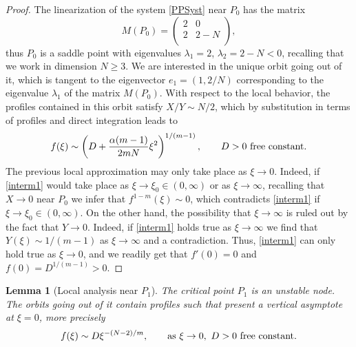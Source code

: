 \documentclass[a4paper,11pt]{article}
\newtheorem{lemma}[theorem]{Lemma}
\numberwithin{equation}{section}
\begin{document}
\begin{proof}
The linearization of the system \eqref{PPSyst} near $P_0$ has the matrix
$$M(P_0)=\left(
  \begin{array}{cc}
    2 & 0 \\
    2 & 2-N \\
  \end{array}
\right),$$
thus $P_0$ is a saddle point with eigenvalues $\lambda_1=2$, $\lambda_2=2-N<0$, recalling that we work in dimension $N\geq3$. We are interested in the unique orbit going out of it, which is tangent to the eigenvector $e_1=(1,2/N)$ corresponding to the eigenvalue $\lambda_1$ of the matrix $M(P_0)$. With respect to the local behavior, the profiles contained in this orbit satisfy $X/Y\sim N/2$, which by substitution in terms of profiles and direct integration leads to
\begin{equation}\label{interm1}
f(\xi)\sim\left(D+\frac{\alpha(m-1)}{2mN}\xi^2\right)^{1/(m-1)}, \qquad D>0 \ {\rm free \ constant}.
\end{equation}
The previous local approximation may only take place as $\xi\to0$. Indeed, if \eqref{interm1} would take place as $\xi\to\xi_0\in(0,\infty)$ or as $\xi\to\infty$, recalling that $X\to0$ near $P_0$ we infer that $f^{1-m}(\xi)\sim0$, which contradicts \eqref{interm1} if $\xi\to\xi_0\in(0,\infty)$. On the other hand, the possibility that $\xi\to\infty$ is ruled out by the fact that $Y\to0$. Indeed, if \eqref{interm1} holds true as $\xi\to\infty$ we find that $Y(\xi)\sim 1/(m-1)$ as $\xi\to\infty$ and a contradiction. Thus, \eqref{interm1} can only hold true as $\xi\to0$, and we readily get that $f'(0)=0$ and $f(0)=D^{1/(m-1)}>0$.
\end{proof}
\begin{lemma}[Local analysis near $P_1$]\label{lem.P1}
The critical point $P_1$ is an unstable node. The orbits going out of it contain profiles such that present a vertical asymptote at $\xi=0$, more precisely
\begin{equation}\label{beh.P1}
f(\xi)\sim D\xi^{-(N-2)/m}, \qquad {\rm as} \ \xi\to0, \ D>0 \ {\rm free \ constant}.
\end{equation}
\end{lemma}
\end{document}
